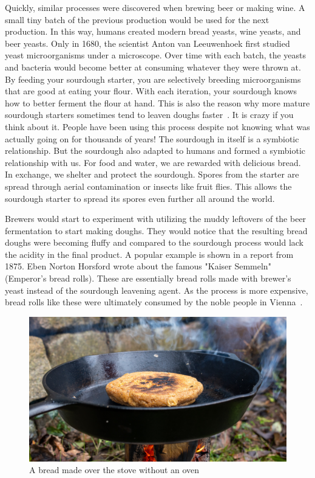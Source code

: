 Quickly, similar processes were discovered when brewing beer
or making wine. A small tiny batch of the previous production
would be used for the next production. In this way, humans created
modern bread yeasts, wine yeasts, and beer yeasts. Only in 1680,
the scientist Anton van Leeuwenhoek first studied yeast microorganisms
under a microscope. Over time with each batch, the yeasts and bacteria
would become better at consuming whatever they were thrown at.
By feeding your sourdough starter, you are selectively breeding
microorganisms that are good at eating your flour. With
each iteration, your sourdough knows how to better ferment the flour
at hand. This is also the reason why more mature sourdough starters sometimes
tend to leaven doughs faster~\cite{review+of+sourdough+starters}. It is crazy if you
think about it. People have been using this process despite not
knowing what was actually going on for thousands of years! The
sourdough in itself is a symbiotic relationship. But the sourdough
also adapted to humans and formed a symbiotic relationship with us.
For food and water, we are rewarded with delicious bread. In exchange,
we shelter and protect the sourdough. Spores from the starter
are spread through aerial contamination or insects like fruit flies.
This allows the sourdough starter to spread its spores even
further all around the world. 

Brewers would start to experiment with utilizing the muddy leftovers
of the beer fermentation to start making doughs. They would notice
that the resulting bread doughs were becoming fluffy and compared
to the sourdough process would lack the acidity in the final product.
A popular example is shown in a report from 1875. Eben Norton Horsford
wrote about the famous "Kaiser Semmeln" (Emperor's bread rolls).
These are essentially bread rolls made with brewer's yeast instead
of the sourdough leavening agent. As the process is more expensive,
bread rolls like these were ultimately consumed by the noble people
in Vienna~\cite{vienna+breadrolls}.

\begin{figure}[h]
  \includegraphics[width=\textwidth]{sourdough-stove}
  \caption{A bread made over the stove without an oven}
  \label{sourdough-stove}
\end{figure}

